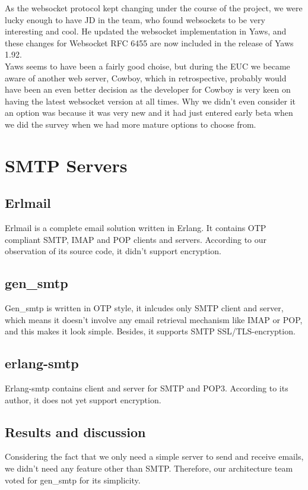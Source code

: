 \documentclass[11pt,a4paper]{report}
\begin{document}
As the websocket protocol kept changing under the course of the project, we were
lucky enough to have JD in the team, who found websockets to be very interesting
and cool. He updated the websocket implementation in Yaws, and these changes for
Websocket RFC 6455 are now included in the release of Yaws 1.92.\\


Yaws seems to have been a fairly good choise, but during the EUC we became
aware of another web server, Cowboy\cite{cowboy_pres}, which in retrospective,
probably would have been an even better decision as the developer for Cowboy is
very keen on having the latest websocket version at all times. Why we didn't
even consider it an option was because it was very new and it had just entered
early beta when we did the survey when we had more mature options to choose from.

\section{SMTP Servers}
\subsection{Erlmail}
Erlmail is a complete email solution written in Erlang. It contains OTP
compliant SMTP, IMAP and POP clients and servers. According to our observation
of its source code, it didn't support encryption.

\subsection{gen\_smtp}
Gen\_smtp is written in OTP style, it inlcudes only SMTP client and server,
which means it doesn't involve any email retrieval mechanism like IMAP or POP,
and this makes it look simple. Besides, it supports SMTP SSL/TLS-encryption.

\subsection{erlang-smtp}
Erlang-smtp contains client and server for SMTP and POP3.
According to its author, it does not yet support encryption.

\subsection{Results and discussion}
Considering the fact that we only need a simple server to send and receive
emails, we didn't need any feature other than SMTP. Therefore,
our architecture team voted for gen\_smtp for its simplicity.
\end{document}
